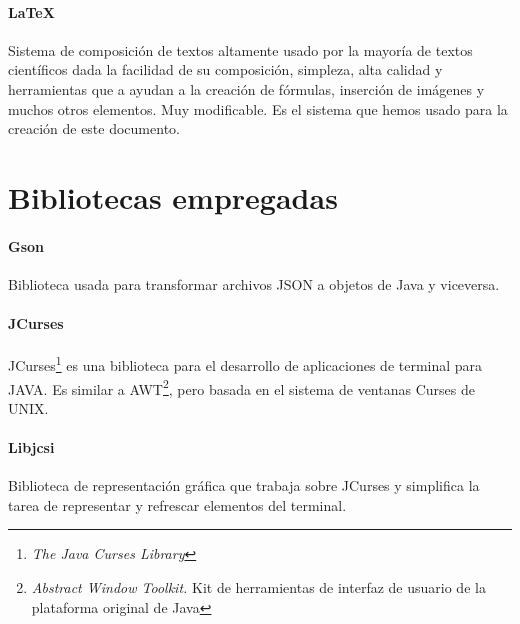 \paragraph{\LaTeX} Sistema de composición de textos altamente usado por la mayoría de textos científicos dada la facilidad de su composición, simpleza, alta calidad y herramientas que a ayudan a la creación de fórmulas, inserción de imágenes y muchos otros elementos. Muy modificable. Es el sistema que hemos usado para la creación de este documento.

\section{Bibliotecas empregadas}

\paragraph{Gson} Biblioteca usada para transformar archivos JSON a objetos de Java y viceversa.

\paragraph{JCurses} JCurses\footnote{\textit{The Java Curses Library}} es una biblioteca para el desarrollo de aplicaciones de terminal para JAVA. Es similar a AWT\footnote{\textit{Abstract Window Toolkit.} Kit de herramientas de interfaz de usuario de la plataforma original de Java}, pero basada en el sistema de ventanas Curses de UNIX.

\paragraph{Libjcsi} Biblioteca de representación gráfica que trabaja sobre JCurses y simplifica la tarea de representar y refrescar elementos del terminal.
